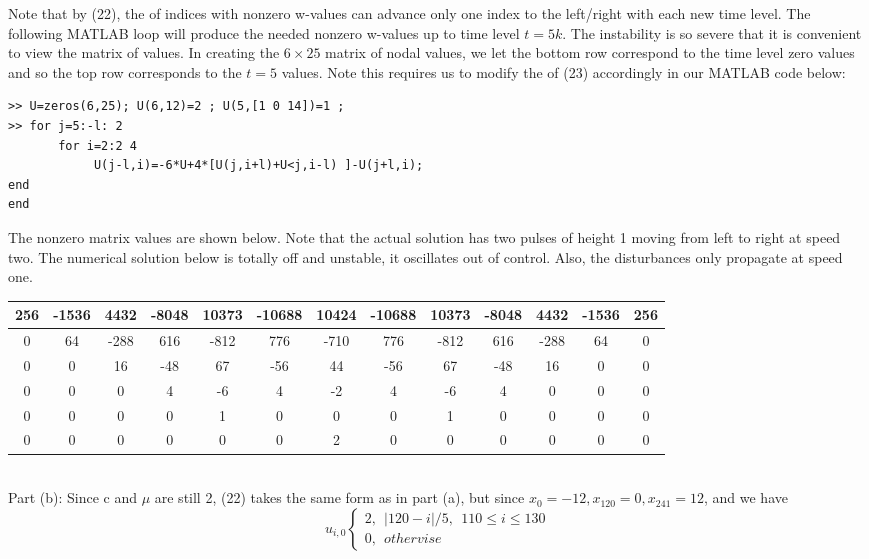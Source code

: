 \documentclass[../main.tex]{subfiles}
\begin{document}
{{Note that by (22), the of indices with nonzero w-values can advance only one index to the left/right with each new time level. The following MATLAB loop will produce the needed nonzero w-values up to time level $t = 5k$. The instability is so severe that it is  convenient to view the matrix of values. In creating the $6\times 25$ matrix of nodal values, we let the bottom row correspond to the time level zero values and so the top row corresponds to the $t = 5$ values. Note this requires us to modify the of (23) accordingly in our MATLAB code below: 
\begin{lstlisting}[numbers=none,frame=none]
>> U=zeros(6,25); U(6,12)=2 ; U(5,[1 0 14])=1 ; 
>> for j=5:-l: 2 
	   for i=2:2 4 
		    U(j-l,i)=-6*U+4*[U(j,i+l)+U<j,i-l) ]-U(j+l,i);
end 
end 
\end{lstlisting}
The nonzero matrix values are shown below. Note that the actual solution has two 
pulses of height 1 moving from left to right at speed two. The numerical solution 
below is totally off and unstable, it oscillates out of control. Also, the disturbances 
only propagate at speed one. \\
\begin{table}[!ht]
    \centering
    \begin{tabular}{|c|c|c|c|c|c|c|c|c|c|c|c|c|}
    \hline
        256 & -1536 & 4432 & -8048 & 10373 & -10688 & 10424 & -10688 & 10373 & -8048 &4432 & -1536 & 256 \\ \hline
        0 & 64 & -288 & 616 & -812 & 776 & -710 & 776 & -812 & 616 &-288 & 64 & 0\\ \hline
        0 & 0 & 16 & -48 & 67 & -56 & 44 & -56 & 67 & -48 & 16 & 0 & 0\\ \hline
        0 & 0 & 0 & 4 & -6 & 4 & -2 & 4 & -6 & 4 & 0 & 0 & 0 \\ \hline
        0 & 0 & 0 & 0 & 1 & 0 & 0 & 0 & 1 & 0 & 0 & 0 & 0\\ \hline
        0 & 0 & 0 & 0 & 0 & 0 & 2 & 0 & 0 & 0 & 0 & 0 & 0\\ \hline
    \end{tabular}
\end{table}
\\
Part (b): Since c and $ \mu$ are still 2, (22) takes the same form as in part (a), but 
since $x_0 = -12, x_{120} = 0, x_{241} = 12$, and we have
$$u_{i,0}
	\begin{cases}
		2, ~~\vert 120-i\vert /5, ~~ 110 \leqslant i \leqslant 130\\
		0, ~~othervise
	\end{cases}$$
}}
\end{document}
